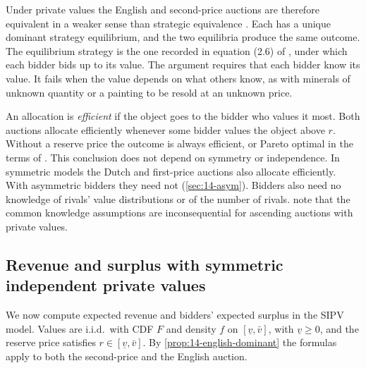 Under private values the English and second-price auctions are therefore equivalent in a weaker sense than
strategic equivalence \citep[p.~1091]{MilgromWeber1982}. Each has a unique dominant strategy equilibrium,
and the two equilibria produce the same outcome. The equilibrium strategy is the one recorded in equation
(2.6) of \citet{AtheyHaile2007}, under which each bidder bids up to its value. The argument requires that
each bidder know its value. It fails when the value depends on what others know, as with minerals of
unknown quantity or a painting to be resold at an unknown price.

An allocation is \emph{efficient} if the object goes to the bidder who values it most. Both auctions
allocate efficiently whenever some bidder values the object above $r$. Without a reserve price the
outcome is always efficient, or Pareto optimal in the terms of \citet[p.~1091]{MilgromWeber1982}. This conclusion does not
depend on symmetry or independence. In symmetric models the Dutch and
first-price auctions also allocate efficiently. With asymmetric bidders they need not
(\cref{sec:14-asym}). Bidders also need no knowledge of rivals' value distributions or of the number of
rivals. \citet[Section~2.1]{AtheyHaile2007} note that the common knowledge assumptions are inconsequential
for ascending auctions with private values.

\subsection{Revenue and surplus with symmetric independent private values}\label{sec:14-spa-revenue}

We now compute expected revenue and bidders' expected surplus in the SIPV model. Values are i.i.d.\ with CDF
$F$ and density $f$ on $[\underline v,\bar v]$, with $\underline v\ge 0$, and the reserve price satisfies
$r\in[\underline v,\bar v]$. By \cref{prop:14-english-dominant} the formulas apply to both the second-price
and the English auction.

